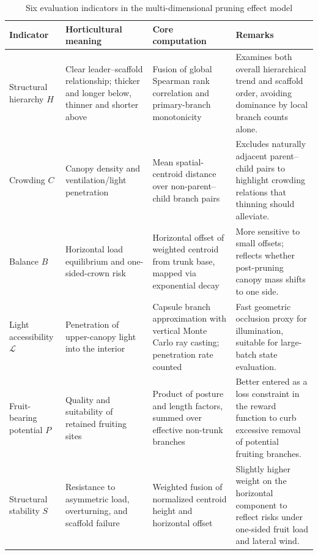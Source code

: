 \documentclass[12pt,a4paper,fontset=fandol]{ctexart}
\begin{document}
\begin{table}[H]
\centering
\small
\setlength{\tabcolsep}{4pt}
\renewcommand{\arraystretch}{1.15}
\begin{tabularx}{\textwidth}{>{\raggedright\arraybackslash}p{2.5cm}>{\raggedright\arraybackslash}p{3.2cm}>{\raggedright\arraybackslash}p{4.0cm}>{\raggedright\arraybackslash}X}
\toprule
\textbf{Indicator} & \textbf{Horticultural meaning} & \textbf{Core computation} & \textbf{Remarks} \\
\midrule
Structural hierarchy $H$ & Clear leader--scaffold relationship; thicker and longer below, thinner and shorter above & Fusion of global Spearman rank correlation and primary-branch monotonicity & Examines both overall hierarchical trend and scaffold order, avoiding dominance by local branch counts alone. \\
\addlinespace[6pt]
Crowding $C$ & Canopy density and ventilation/light penetration & Mean spatial-centroid distance over non-parent--child branch pairs & Excludes naturally adjacent parent--child pairs to highlight crowding relations that thinning should alleviate. \\
\addlinespace[6pt]
Balance $B$ & Horizontal load equilibrium and one-sided-crown risk & Horizontal offset of weighted centroid from trunk base, mapped via exponential decay & More sensitive to small offsets; reflects whether post-pruning canopy mass shifts to one side. \\
\addlinespace[6pt]
Light accessibility $\mathcal{L}$ & Penetration of upper-canopy light into the interior & Capsule branch approximation with vertical Monte Carlo ray casting; penetration rate counted & Fast geometric occlusion proxy for illumination, suitable for large-batch state evaluation. \\
\addlinespace[6pt]
Fruit-bearing potential $P$ & Quality and suitability of retained fruiting sites & Product of posture and length factors, summed over effective non-trunk branches & Better entered as a loss constraint in the reward function to curb excessive removal of potential fruiting branches. \\
\addlinespace[6pt]
Structural stability $S$ & Resistance to asymmetric load, overturning, and scaffold failure & Weighted fusion of normalized centroid height and horizontal offset & Slightly higher weight on the horizontal component to reflect risks under one-sided fruit load and lateral wind. \\
\bottomrule
\end{tabularx}
\caption{Six evaluation indicators in the multi-dimensional pruning effect model}
\label{tab:kpis}
\end{table}
\end{document}
